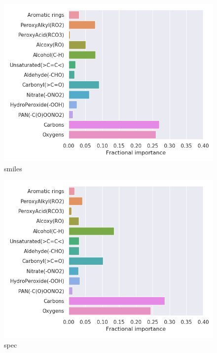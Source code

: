 \begin{subfigure}[b]{0.46\textwidth}
    \centering
    \includegraphics[width=\textwidth]{outputs/PCA/smiles/legend.png}
    \caption{smiles}
    \label{fig:legend_PCA_smiles}
\end{subfigure}
\begin{subfigure}[b]{0.46\textwidth}
    \centering
    \includegraphics[width=\textwidth]{outputs/PCA/spec/legend.png}
    \caption{spec}
    \label{fig:legend_PCA_spec}
\end{subfigure}

